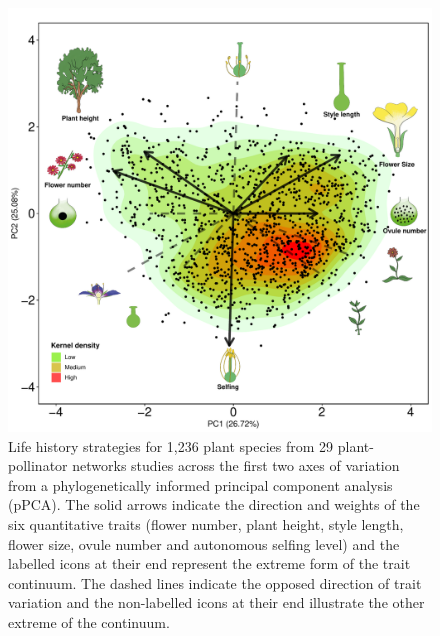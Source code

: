 \documentclass[12pt,a4paper,]{article}
\begin{document}
\begin{figure}
\centering
\includegraphics{output/figures/unnamed-chunk-5-1.pdf}
\caption{\label{fig:unnamed-chunk-5}Life history strategies for 1,236 plant
species from 29 plant-pollinator networks studies across the first two
axes of variation from a phylogenetically informed principal component
analysis (pPCA). The solid arrows indicate the direction and weights of
the six quantitative traits (flower number, plant height, style length,
flower size, ovule number and autonomous selfing level) and the labelled
icons at their end represent the extreme form of the trait continuum.
The dashed lines indicate the opposed direction of trait variation and
the non-labelled icons at their end illustrate the other extreme of the
continuum.}
\end{figure}
\end{document}
